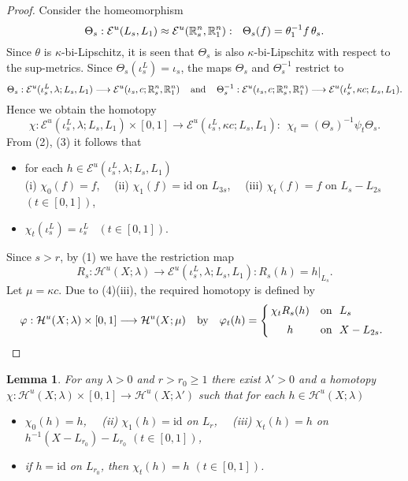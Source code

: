 \documentclass[11pt, fleqn]{amsart}
\newtheorem{lemma}{Lemma}[section]
\theoremstyle{definition}
\newcommand{\cal}{\mathcal}
\renewcommand{\phi}{\varphi}
\newcommand{\lra}{\longrightarrow}
\newcommand{\id}{\mathrm{id}}
\newcommand{\E}{\mathcal E}
\newcommand{\IR}{\mathbb R}
\begin{document}
\begin{proof}
Consider the homeomorphism 
$$\Theta_s : \E^u(L_s, L_1) \approx \E^u(\IR^n_s, \IR^n_1) : \ \ \Theta_s(f) = \theta_1^{-1} f \hspace{0.5mm}\theta_s.$$ 
Since $\theta$ is $\kappa$-bi-Lipschitz, it is seen that $\Theta_s$ is also $\kappa$-bi-Lipschitz with respect to the sup-metrics. 
Since $\Theta_s(\iota_s^L) = \iota_s$, 
the maps $\Theta_s$ and $\Theta_s^{-1}$ restrict to   
$$\Theta_s : \E^u(\iota_s^L, \lambda; L_s, L_1) \lra \E^u(\iota_s, c; \IR^n_s, \IR^n_1) \hspace{4mm} \text{and} \hspace{4mm}   
\Theta_s^{-1} : \E^u(\iota_s, c; \IR^n_s, \IR^n_1) \lra \E^u(\iota_s^L, \kappa c; L_s, L_1).$$ 
Hence we obtain the homotopy 
$$\chi : \E^u(\iota_s^L, \lambda; L_s, L_1) \times [0,1] \lra \E^u(\iota_s^L, \kappa c; L_s, L_1) : \ \ \chi_t = (\Theta_s)^{-1} \psi_t \Theta_s.$$ 
From (2), (3) it follows that 
\begin{itemize}
\item[(4)] for each $h \in \E^u(\iota_s^L, \lambda; L_s, L_1)$ \\  
\hspace*{5mm} (i) $\chi_0(f) = f$, \ \ (ii) $\chi_1(f) = \id$ on $L_{3s}$, \ \ 
(iii) $\chi_t(f) = f$ on $L_s - L_{2s}$ \ $(t \in [0,1])$,  
\item[(5)] $\chi_t(\iota_s^L) = \iota_s^L$ \ $(t \in [0,1])$. 
\end{itemize} 

Since $s > r$, by (1) we have the restriction map 
$$R_s : {\cal H}^u(X; \lambda) \lra  \E^u(\iota_s^L, \lambda; L_s, L_1) : R_s(h) = h|_{L_s}.$$ 
Let $\mu =\kappa c$. 
Due to (4)(iii), the required homotopy is defined by 
$$\phi : {\cal H}^u(X; \lambda) \times [0,1] \lra {\cal H}^u(X; \mu) \ \ \ \text{by} \ \ \ 
\phi_t(h) = 
\left\{ 
\begin{array}[c]{@{\,}cl}
\chi_tR_s(h) & \text{on \ $L_s$} \\[2mm] 
h & \text{on \ $X - L_{2s}.$}
\end{array} \right.$$
\vskip -5mm 
\end{proof} 

\begin{lemma}\label{lemma_deform_homeo_2} 
For any $\lambda > 0$ and $r > r_0 \geq 1$ there exist $\lambda' > 0$ and 
a homotopy $\chi : {\cal H}^u(X; \lambda) \times [0,1] \lra {\cal H}^u(X; \lambda')$
such that for each $h \in {\cal H}^u(X; \lambda)$
\begin{itemize}
\item[(i)\,] $\chi_0(h) = h$, \ \ {\rm (ii)} $\chi_1(h) = \id$ on $L_r$, \ \ {\rm (iii)} $\chi_t(h) = h$ on $h^{-1}(X - L_{r_0}) - L_{r_0}$ $(t \in [0,1])$, 
\item[(iv)] if $h = \id$ on $L_{r_0}$, then $\chi_t(h) = h$ $(t \in [0,1])$. 
\end{itemize} 
\end{lemma}
\end{document}
